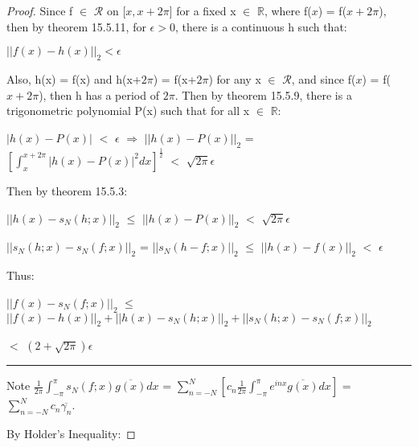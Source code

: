     \begin{proof} 
        Since f $\in$ $\mathscr{R}$ on [$x,x+2\pi$] for a fixed
        x $\in$ $\mathbb{R}$,
        where f($x$) = f($x+2\pi$), then by {\color{red} theorem 15.5.11},
        for $\epsilon > 0$, there is a continuous h such that:

        \hspace{0.5cm}
        $||f(x) - h(x)||_2 < \epsilon$

        Also, h(x) = f(x) and h(x+$2\pi$) = f(x+$2\pi$) for any x $\in$
        $\mathscr{R}$, and since f($x$) = f($x+2\pi$),
        then h has a period of $2\pi$.
        Then by {\color{red} theorem 15.5.9}, there is a trigonometric polynomial
        P(x) such that for all x $\in$ $\mathbb{R}$:

        \hspace{0.5cm}
        $|h(x) - P(x)|$ $<$ $\epsilon$
        \hspace{0.6cm}
        $\Rightarrow$
        \hspace{0.6cm}
        $||h(x) - P(x)||_2$
        = $[\int_{x}^{x+2\pi} |h(x) - P(x)|^2 dx]^{\frac{1}{2}}$
        $<$ $\sqrt{2\pi}\epsilon$

        Then by {\color{red} theorem 15.5.3}:

        \hspace{0.5cm}
        $||h(x) - s_N(h;x)||_2$
        $\leq$ $||h(x) - P(x)||_2$
        $<$ $\sqrt{2\pi}\epsilon$

        \hspace{0.5cm}
        $||s_N(h;x) - s_N(f;x)||_2$
        = $||s_N(h-f;x)||_2$
        $\leq$ $||h(x) - f(x)||_2$ $<$ $\epsilon$

        Thus:
        
        \hspace{0.5cm}
        $||f(x) - s_N(f;x)||_2$
        $\leq$ $||f(x)-h(x)||_2 + ||h(x)-s_N(h;x)||_2 + ||s_N(h;x)-s_N(f;x)||_2$
        
        \hspace{3.9cm}
        $<$ $(2+\sqrt{2\pi})\epsilon$

        \rule[0.1cm]{16.7cm}{0.01cm}

        Note
        $\frac{1}{2\pi} \int_{-\pi}^{\pi} s_N(f;x)\overline{g(x)} dx$
        = $\sum_{n=-N}^N [c_n \frac{1}{2\pi}
            \int_{-\pi}^{\pi} e^{inx}\overline{g(x)} dx]$
        = $\sum_{n=-N}^N c_n \overline{\gamma_n}$.

        By Holder's Inequality:


\end{proof}
